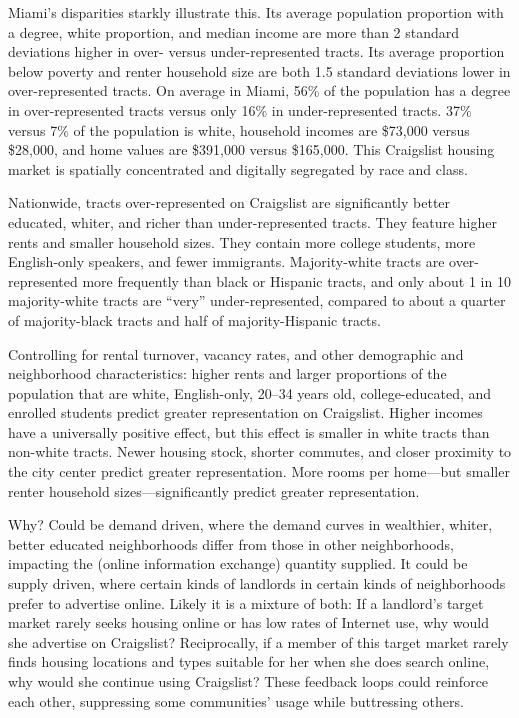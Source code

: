 \documentclass[12pt,onecolumn]{article} %
\begin{document}
Miami's disparities starkly illustrate this. Its average population proportion with a degree, white proportion, and median income are more than 2 standard deviations higher in over- versus under-represented tracts. Its average proportion below poverty and renter household size are both 1.5 standard deviations lower in over-represented tracts. On average in Miami, 56\% of the population has a degree in over-represented tracts versus only 16\% in under-represented tracts. 37\% versus 7\% of the population is white, household incomes are \$73,000 versus \$28,000, and home values are \$391,000 versus \$165,000. This Craigslist housing market is spatially concentrated and digitally segregated by race and class.

Nationwide, tracts over-represented on Craigslist are significantly better educated, whiter, and richer than under-represented tracts. They feature higher rents and smaller household sizes. They contain more college students, more English-only speakers, and fewer immigrants. Majority-white tracts are over-represented more frequently than black or Hispanic tracts, and only about 1 in 10 majority-white tracts are \enquote{very} under-represented, compared to about a quarter of majority-black tracts and half of majority-Hispanic tracts.

Controlling for rental turnover, vacancy rates, and other demographic and neighborhood characteristics: higher rents and larger proportions of the population that are white, English-only, 20--34 years old, college-educated, and enrolled students predict greater representation on Craigslist. Higher incomes have a universally positive effect, but this effect is smaller in white tracts than non-white tracts. Newer housing stock, shorter commutes, and closer proximity to the city center predict greater representation. More rooms per home---but smaller renter household sizes---significantly predict greater representation.

Why? Could be demand driven, where the demand curves in wealthier, whiter, better educated neighborhoods differ from those in other neighborhoods, impacting the (online information exchange) quantity supplied. It could be supply driven, where certain kinds of landlords in certain kinds of neighborhoods prefer to advertise online. Likely it is a mixture of both: If a landlord's target market rarely seeks housing online or has low rates of Internet use, why would she advertise on Craigslist? Reciprocally, if a member of this target market rarely finds housing locations and types suitable for her when she does search online, why would she continue using Craigslist? These feedback loops could reinforce each other, suppressing some communities' usage while buttressing others.
\end{document}
